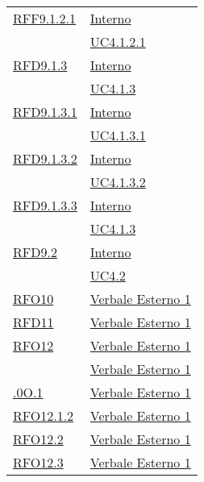\begin{longtable}{|>{\centering}m{5cm}|m{5cm}<{\centering}|}
\hyperlink{RFF9.1.2.1}{RFF9.1.2.1} & \hyperlink{Interno}{Interno}\\
& \hyperref[UC4.1.2.1]{UC4.1.2.1}\\ \hline

\hyperlink{RFD9.1.3}{RFD9.1.3} & \hyperlink{Interno}{Interno}\\
& \hyperref[UC4.1.3]{UC4.1.3}\\ \hline

\hyperlink{RFD9.1.3.1}{RFD9.1.3.1} & \hyperlink{Interno}{Interno}\\
& \hyperref[UC4.1.3.1]{UC4.1.3.1}\\ \hline

\hyperlink{RFD9.1.3.2}{RFD9.1.3.2} & \hyperlink{Interno}{Interno}\\
& \hyperref[UC4.1.3.2]{UC4.1.3.2}\\ \hline

\hyperlink{RFD9.1.3.3}{RFD9.1.3.3} & \hyperlink{Interno}{Interno}\\
& \hyperref[UC4.1.3]{UC4.1.3}\\ \hline

\hyperlink{RFD9.2}{RFD9.2} & \hyperlink{Interno}{Interno}\\
& \hyperref[UC4.2]{UC4.2}\\ \hline

\hyperlink{RFO10}{RFO10} & \hyperlink{Verbale Esterno 1}{Verbale Esterno 1}\\ \hline

\hyperlink{RFD11}{RFD11} & \hyperlink{Verbale Esterno 1}{Verbale Esterno 1}\\ \hline

\hyperlink{RFO12}{RFO12} & \hyperlink{Verbale Esterno 1}{Verbale Esterno 1}\\ \hline

\hyperlink{}{} & \hyperlink{Verbale Esterno 1}{Verbale Esterno 1}\\ \hline

\hyperlink{.0O.1}{.0O.1} & \hyperlink{Verbale Esterno 1}{Verbale Esterno 1}\\ \hline

\hyperlink{RFO12.1.2}{RFO12.1.2} & \hyperlink{Verbale Esterno 1}{Verbale Esterno 1}\\ \hline

\hyperlink{RFO12.2}{RFO12.2} & \hyperlink{Verbale Esterno 1}{Verbale Esterno 1}\\ \hline

\hyperlink{RFO12.3}{RFO12.3} & \hyperlink{Verbale Esterno 1}{Verbale Esterno 1}\\ \hline


\end{longtable}
